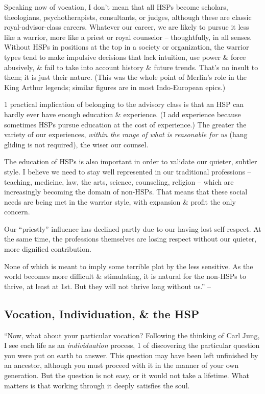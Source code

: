 \documentclass{article}
\numberwithin{equation}{section}
\begin{document}
Speaking now of vocation, I don't mean that all HSPs become scholars, theologians, psychotherapists, consultants, or judges, although these are classic royal-advisor-class careers. Whatever our career, we are likely to pursue it less like a warrior, more like a priest or royal counselor -- thoughtfully, in all senses. Without HSPs in positions at the top in a society or organization, the warrior types tend to make impulsive decisions that lack intuition, use power \& force abusively, \& fail to take into account history \& future trends. That's no insult to them; it is just their nature. (This was the whole point of Merlin's role in the King Arthur legends; similar figures are in most Indo-European epics.)

1 practical implication of belonging to the advisory class is that an HSP can hardly ever have enough education \& experience. (I add experience because sometimes HSPs pursue education at the cost of experience.) The greater the variety of our experiences, \textit{within the range of what is reasonable for us} (hang gliding is not required), the wiser our counsel.

The education of HSPs is also important in order to validate our quieter, subtler style. I believe we need to stay well represented in our traditional professions -- teaching, medicine, law, the arts, science, counseling, religion -- which are increasingly becoming the domain of non-HSPs. That means that these social needs are being met in the warrior style, with expansion \& profit the only concern.

Our ``priestly'' influence has declined partly due to our having lost self-respect. At the same time, the professions themselves are losing respect without our quieter, more dignified contribution.

None of which is meant to imply some terrible plot by the less sensitive. As the world becomes more difficult \& stimulating, it is natural for the non-HSPs to thrive, at least at 1st. But they will not thrive long without us.'' -- \cite[pp. 148--149]{Aron2013}

\subsection{Vocation, Individuation, \& the HSP}
``Now, what about your particular vocation? Following the thinking of Carl Jung, I see each life as an \textit{individuation} process, 1 of discovering the particular question you were put on earth to answer. This question may have been left unfinished by an ancestor, although you must proceed with it in the manner of your own generation. But the question is not easy, or it would not take a lifetime. What matters is that working through it deeply satisfies the soul.
\end{document}
